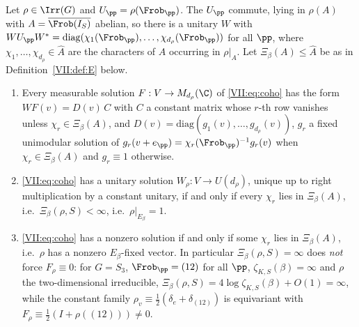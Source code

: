 \begin{proposition}\label{VII:prop:gauge}
Let $\rho\in\Irr(G)$ and $U_\pp=\rho(\Frob_\pp)$. The $U_\pp$ commute, lying in $\rho(A)$
with $A=\overline{\Frob(I_S)}$ abelian, so there is a unitary $W$ with
$WU_\pp W^*=\mathrm{diag}(\chi_1(\Frob_\pp),\dots,\chi_{d_\rho}(\Frob_\pp))$ for all $\pp$,
where $\chi_1,\dots,\chi_{d_\rho}\in\widehat A$ are the characters of $A$ occurring in
$\rho|_A$. Let $\Xi_\beta(A)\le\widehat A$ be as in Definition~\ref{VII:def:E} below.
\begin{enumerate}
\item Every measurable solution $F:V\to M_{d_\rho}(\C)$ of \eqref{VII:eq:coho} has the form
$WF(v)=D(v)\,C$ with $C$ a constant matrix whose $r$-th row vanishes unless
$\chi_r\in\Xi_\beta(A)$, and $D(v)=\mathrm{diag}(g_1(v),\dots,g_{d_\rho}(v))$, $g_r$ a fixed
unimodular solution of $g_r(v+e_\pp)=\chi_r(\Frob_\pp)^{-1}g_r(v)$ when $\chi_r\in\Xi_\beta(A)$
and $g_r\equiv1$ otherwise.
\item \eqref{VII:eq:coho} has a unitary solution $W_\rho:V\to U(d_\rho)$, unique up to right
multiplication by a constant unitary, if and only if every $\chi_r$ lies in $\Xi_\beta(A)$,
i.e.\ $\Xi_\beta(\rho,S)<\infty$, i.e.\ $\rho|_{E_\beta}=1$.
\item \eqref{VII:eq:coho} has a nonzero solution if and only if some $\chi_r$ lies in
$\Xi_\beta(A)$, i.e.\ $\rho$ has a nonzero $E_\beta$-fixed vector. In particular
$\Xi_\beta(\rho,S)=\infty$ does \emph{not} force $F_\rho\equiv0$: for $G=S_3$,
$\Frob_\pp=(12)$ for all $\pp$, $\zeta_{K,S}(\beta)=\infty$ and $\rho$ the two-dimensional
irreducible, $\Xi_\beta(\rho,S)=4\log\zeta_{K,S}(\beta)+O(1)=\infty$, while the constant
family $\rho_v\equiv\frac12(\delta_e+\delta_{(12)})$ is equivariant with
$F_\rho\equiv\frac12(I+\rho((12)))\ne0$.
\end{enumerate}
\end{proposition}

